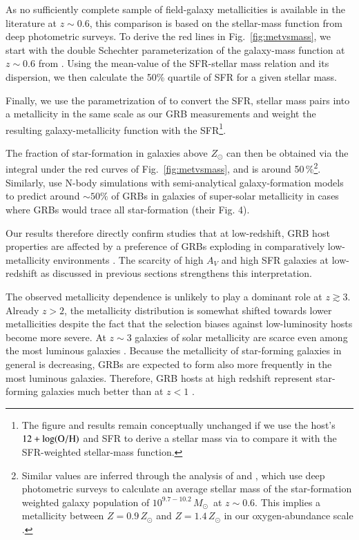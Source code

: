 \documentclass[traditabstract, longauth]{aa}
\newcommand{\oh}{12+\log(\rm{O/H})}
\newcommand{\Msun}{$M_\odot$}
\begin{document}
 {As no sufficiently complete sample of field-galaxy metallicities is available in the literature at $z\sim0.6$, this comparison is based on the stellar-mass function from deep photometric surveys. To derive the red lines in Fig.~\ref{fig:metvsmass}, we start with the double Schechter parameterization of the galaxy-mass function at $z\sim0.6$ from \citet{2014ApJ...783...85T}. Using the mean-value of the SFR-stellar mass relation and its dispersion, we then calculate the 50\% quartile of SFR for a given stellar mass. }
 
 {Finally, we use the parametrization of \citet{2010MNRAS.408.2115M} to convert the SFR, stellar mass pairs into a metallicity in the same scale as our GRB measurements and weight the resulting galaxy-metallicity function with the SFR\footnote{The figure and results remain conceptually unchanged if we use the host's $\oh$ and SFR to derive a stellar mass via \citet{2010MNRAS.408.2115M} to compare it with the SFR-weighted stellar-mass function.}.}

 {The fraction of star-formation in galaxies above $Z_{\odot}$ can then be obtained via the integral under the red curves of Fig.~\ref{fig:metvsmass}, and is around 50\,\%\footnote{Similar values are inferred through the analysis of \citet{2013ApJ...778..128P} and \citet{2014A&A...565A.112H}, which use deep photometric surveys \citep{2009ApJ...702.1393K, 2013A&A...556A..55I} to calculate an average stellar mass of the star-formation weighted galaxy population of $10^{9.7-10.2}$\,\Msun\, at $z\sim0.6$. This implies a metallicity between $Z=0.9\,Z_{\odot}$ and $Z=1.4\,Z_{\odot}$ in our oxygen-abundance scale \citep{2010MNRAS.408.2115M}.}. Similarly, \citet[][]{2011MNRAS.417.1013C} use N-body simulations with semi-analytical galaxy-formation models to predict around $\sim 50\%$ of GRBs in galaxies of super-solar metallicity in cases where GRBs would trace all star-formation (their Fig. 4).}

Our results therefore directly confirm studies that at low-redshift, GRB host properties are affected by a preference of GRBs exploding in comparatively low-metallicity environments \citep[e.g.,][Perley et al. 2015c]{2006ApJ...642..636L, 2009ApJ...702..377K, 2010AJ....140.1557L, 2013ApJ...774..119G, 2013ApJ...778..128P, 2014arXiv1409.7064V, 2015arXiv150304246S}. The scarcity of high $A_V$ and high SFR galaxies at low-redshift as discussed in previous sections strengthens this interpretation.

The observed metallicity dependence is unlikely to play a dominant role at $z\gtrsim3$. Already $z > 2$, the metallicity distribution is somewhat shifted towards lower metallicities despite the fact that the selection biases against low-luminosity hosts become more severe. At $z\sim3$ galaxies of solar metallicity are scarce even among the most luminous galaxies \citep{2014A&A...563A..58T}. Because the metallicity of star-forming galaxies in general is decreasing, GRBs are expected to form also more frequently in the most luminous galaxies. Therefore, GRB hosts at high redshift represent star-forming galaxies much better than at $z<1$ \citep[see also][]{2015arXiv150305323G, 2015arXiv150402479P}.
\end{document}
